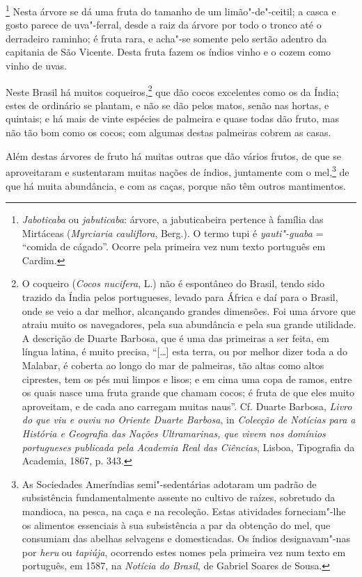 \footnote{ \textit{Jaboticaba} ou
\textit{jabuticaba}: árvore, a jabuticabeira pertence à família das
Mirtáceas (\textit{Myrciaria cauliflora}, Berg.). O termo tupi é
\textit{yauti"-guaba} = ``comida de cágado''. Ocorre pela primeira vez num
texto português em Cardim.} Nesta árvore se dá uma fruta do
tamanho de um limão"-de"-ceitil; a casca e gosto parece de uva"-ferral,
desde a raiz da árvore por todo o tronco até o derradeiro raminho; é
fruta rara, e acha"-se somente pelo sertão adentro da capitania de São
Vicente. Desta fruta fazem os índios vinho e o cozem como vinho de uvas.

Neste Brasil há muitos coqueiros,\footnote{ O coqueiro (\textit{Cocos
nucifera}, L.) não é espontâneo do Brasil, tendo sido trazido da Índia
pelos portugueses, levado para África e daí para o Brasil, onde se veio
a dar melhor, alcançando grandes dimensões. Foi uma árvore que atraiu
muito os navegadores, pela sua abundância e pela sua grande utilidade.
A descrição de Duarte Barbosa, que é uma das primeiras a ser feita, em
língua latina, é muito precisa, ``[\ldots{}] esta terra, ou por
melhor dizer toda a do Malabar, é coberta ao longo do mar de palmeiras,
tão altas como altos ciprestes, tem os pés mui limpos e lisos; e em
cima uma copa de ramos, entre os quais nasce uma fruta grande que
chamam cocos; é fruta de que eles muito aproveitam, e de cada ano
carregam muitas naus''. Cf. Duarte Barbosa, \textit{Livro do
que viu e ouviu no Oriente Duarte Barbosa}, in \textit{Colecção de
Notícias para a História e Geografia das Nações Ultramarinas, que vivem
nos domínios portugueses publicada pela Academia Real das Ciências}, 
Lisboa, Tipografia da Academia, 1867, p. 343.} que dão cocos
excelentes como os da Índia; estes de ordinário se plantam, e não se
dão pelos matos, senão nas hortas, e quintais; e há mais de vinte
espécies de palmeira e quase todas dão fruto, mas não tão bom como os
cocos; com algumas destas palmeiras cobrem as casas.

 Além destas árvores de fruto há muitas outras que dão vários frutos, de
que se aproveitaram e sustentaram muitas nações de índios, juntamente
com o mel,\footnote{ As Sociedades Ameríndias semi"-sedentárias
adotaram um padrão de subsistência fundamentalmente assente no
cultivo de raízes, sobretudo da mandioca, na pesca, na caça e na
recoleção. Estas atividades forneciam"-lhe os alimentos essenciais à
sua subsistência a par da obtenção do mel, que consumiam das abelhas
selvagens e domesticadas. Os índios designavam"-nas por \textit{heru} ou
\textit{tapiúja}, ocorrendo estes nomes pela primeira vez num texto em
português, em 1587, na \textit{Notícia do Brasil}, de Gabriel Soares de
Sousa.} de que há muita abundância, e com as caças, porque não têm outros mantimentos.

